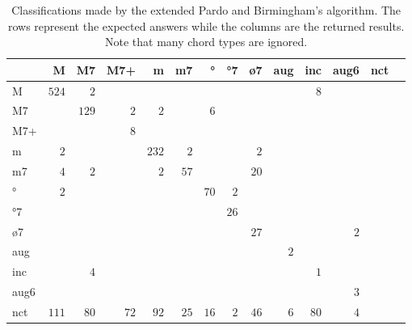 \documentclass{article}
\begin{document}
\begin{table*}
\centering
\begin{tabular}{l||r|r|r|r|r|r|r|r|r|r|r|r|r}
      &     M &    M7 &   M7+ &     m &    m7 &    ° &   °7 &   ø7 &   aug &   inc &  aug6 &   nct \\  \hline \hline
    M & $ 524 $ & $   2 $ & $     $ & $     $ & $     $ & $     $ & $     $ & $     $ & $     $ & $   8 $ & $     $ & $     $ \\ \hline
   M7 & $     $ & $ 129 $ & $   2 $ & $   2 $ & $     $ & $   6 $ & $     $ & $     $ & $     $ & $     $ & $     $ & $     $ \\ \hline
  M7+ & $     $ & $     $ & $   8 $ & $     $ & $     $ & $     $ & $     $ & $     $ & $     $ & $     $ & $     $ & $     $ \\ \hline
    m & $   2 $ & $     $ & $     $ & $ 232 $ & $   2 $ & $     $ & $     $ & $   2 $ & $     $ & $     $ & $     $ & $     $ \\ \hline
   m7 & $   4 $ & $   2 $ & $     $ & $   2 $ & $  57 $ & $     $ & $     $ & $  20 $ & $     $ & $     $ & $     $ & $     $ \\ \hline
   ° & $   2 $ & $     $ & $     $ & $     $ & $     $ & $  70 $ & $   2 $ & $     $ & $     $ & $     $ & $     $ & $     $ \\ \hline
  °7 & $     $ & $     $ & $     $ & $     $ & $     $ & $     $ & $  26 $ & $     $ & $     $ & $     $ & $     $ & $     $ \\ \hline
  ø7 & $     $ & $     $ & $     $ & $     $ & $     $ & $     $ & $     $ & $  27 $ & $     $ & $     $ & $   2 $ & $     $ \\ \hline
  aug & $     $ & $     $ & $     $ & $     $ & $     $ & $     $ & $     $ & $     $ & $   2 $ & $     $ & $     $ & $     $ \\ \hline
  inc & $     $ & $   4 $ & $     $ & $     $ & $     $ & $     $ & $     $ & $     $ & $     $ & $   1 $ & $     $ & $     $ \\ \hline
 aug6 & $     $ & $     $ & $     $ & $     $ & $     $ & $     $ & $     $ & $     $ & $     $ & $     $ & $   3 $ & $     $ \\ \hline
  nct & $ 111 $ & $  80 $ & $  72 $ & $  92 $ & $  25 $ & $  16 $ & $   2 $ & $  46 $ & $   6 $ & $  80 $ & $   4 $ & $     $ \\ \hline
\end{tabular}

\caption{Classifications made by the extended Pardo and Birmingham's algorithm. The rows represent
  the expected answers while the columns are the returned
  results. Note that many chord types are ignored.}
\label{tab:erros-es-pb}
\end{table*}
\end{document}
